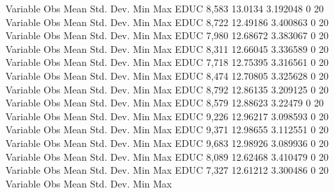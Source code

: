 {\smallskip}
    Variable {\VBAR}        Obs        Mean    Std. Dev.       Min        Max
        EDUC {\VBAR}      8,583     13.0134    3.192048          0         20
{\smallskip}
    Variable {\VBAR}        Obs        Mean    Std. Dev.       Min        Max
        EDUC {\VBAR}      8,722    12.49186    3.400863          0         20
{\smallskip}
    Variable {\VBAR}        Obs        Mean    Std. Dev.       Min        Max
        EDUC {\VBAR}      7,980    12.68672    3.383067          0         20
{\smallskip}
    Variable {\VBAR}        Obs        Mean    Std. Dev.       Min        Max
        EDUC {\VBAR}      8,311    12.66045    3.336589          0         20
{\smallskip}
    Variable {\VBAR}        Obs        Mean    Std. Dev.       Min        Max
        EDUC {\VBAR}      7,718    12.75395    3.316561          0         20
{\smallskip}
    Variable {\VBAR}        Obs        Mean    Std. Dev.       Min        Max
        EDUC {\VBAR}      8,474    12.70805    3.325628          0         20
{\smallskip}
    Variable {\VBAR}        Obs        Mean    Std. Dev.       Min        Max
        EDUC {\VBAR}      8,792    12.86135    3.209125          0         20
{\smallskip}
    Variable {\VBAR}        Obs        Mean    Std. Dev.       Min        Max
        EDUC {\VBAR}      8,579    12.88623     3.22479          0         20
{\smallskip}
    Variable {\VBAR}        Obs        Mean    Std. Dev.       Min        Max
        EDUC {\VBAR}      9,226    12.96217    3.098593          0         20
{\smallskip}
    Variable {\VBAR}        Obs        Mean    Std. Dev.       Min        Max
        EDUC {\VBAR}      9,371    12.98655    3.112551          0         20
{\smallskip}
    Variable {\VBAR}        Obs        Mean    Std. Dev.       Min        Max
        EDUC {\VBAR}      9,683    12.98926    3.089936          0         20
{\smallskip}
    Variable {\VBAR}        Obs        Mean    Std. Dev.       Min        Max
        EDUC {\VBAR}      8,089    12.62468    3.410479          0         20
{\smallskip}
    Variable {\VBAR}        Obs        Mean    Std. Dev.       Min        Max
        EDUC {\VBAR}      7,327    12.61212    3.300486          0         20
{\smallskip}
    Variable {\VBAR}        Obs        Mean    Std. Dev.       Min        Max
